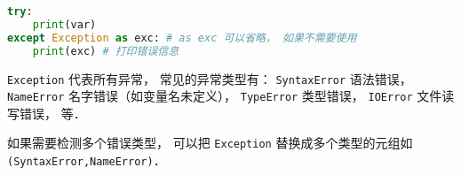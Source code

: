 
\begin{issues}
\issueDraft
\end{issues}

\begin{lstlisting}[language=python]
try:
    print(var)
except Exception as exc: # as exc 可以省略， 如果不需要使用
    print(exc) # 打印错误信息
\end{lstlisting}

\verb|Exception| 代表所有异常， 常见的异常类型有： \verb|SyntaxError| 语法错误， \verb|NameError| 名字错误（如变量名未定义）， \verb|TypeError| 类型错误， \verb|IOError| 文件读写错误， 等．

如果需要检测多个错误类型， 可以把 \verb|Exception| 替换成多个类型的元组如 \verb|(SyntaxError,NameError)|．
